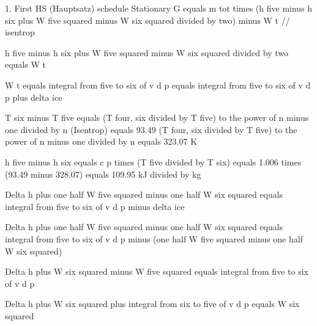 1. First HS (Hauptsatz) schedule
Stationary
G equals m tot times (h five minus h six plus W five squared minus W six squared divided by two) minus W t // isentrop

h five minus h six plus W five squared minus W six squared divided by two equals W t

W t equals integral from five to six of v d p equals integral from five to six of v d p plus delta ice

T six minus T five equals (T four, six divided by T five) to the power of n minus one divided by n (Isentrop) equals 93.49 (T four, six divided by T five) to the power of n minus one divided by n equals 323.07 K

h five minus h six equals c p times (T five divided by T six) equals 1.006 times (93.49 minus 328.07) equals 109.95 kJ divided by kg

Delta h plus one half W five squared minus one half W six squared equals integral from five to six of v d p minus delta ice

Delta h plus one half W five squared minus one half W six squared equals integral from five to six of v d p minus (one half W five squared minus one half W six squared)

Delta h plus W six squared minus W five squared equals integral from five to six of v d p

Delta h plus W six squared plus integral from six to five of v d p equals W six squared